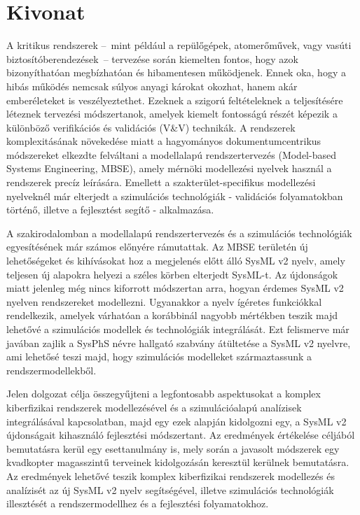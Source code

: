\setcounter{page}{1}

\selecthungarian

\chapter*{Kivonat}

A kritikus rendszerek --~mint például a repülőgépek, atomerőművek, vagy vasúti biztosítóberendezések~-- tervezése során kiemelten fontos, hogy azok bizonyíthatóan megbízhatóan és hibamentesen működjenek. Ennek oka, hogy a hibás működés nemcsak súlyos anyagi károkat okozhat, hanem akár emberéleteket is veszélyeztethet. Ezeknek a szigorú feltételeknek a teljesítésére léteznek tervezési módszertanok, amelyek kiemelt fontosságú részét képezik a különböző verifikációs és validációs (V\&V) technikák. A rendszerek komplexitásának növekedése miatt a hagyományos dokumentumcentrikus módszereket elkezdte felváltani a modellalapú rendszertervezés (Model-based Systems Engineering, MBSE), amely mérnöki modellezési nyelvek használ a rendszerek precíz leírására. Emellett a szakterület-specifikus modellezési nyelveknél már elterjedt a szimulációs technológiák - validációs folyamatokban történő, illetve a fejlesztést segítő - alkalmazása.

A szakirodalomban a modellalapú rendszertervezés és a szimulációs technológiák egyesítésének már számos előnyére rámutattak. Az MBSE területén új lehetőségeket és kihívásokat hoz a megjelenés előtt álló SysML v2 nyelv, amely teljesen új alapokra helyezi a széles körben elterjedt SysML-t. Az újdonságok miatt jelenleg még nincs kiforrott módszertan arra, hogyan érdemes SysML v2 nyelven rendszereket modellezni. Ugyanakkor a nyelv ígéretes funkciókkal rendelkezik, amelyek várhatóan a korábbinál nagyobb mértékben teszik majd lehetővé a szimulációs modellek és technológiák integrálását. Ezt felismerve már javában zajlik a SysPhS névre hallgató szabvány átültetése a SysML v2 nyelvre, ami lehetősé teszi majd, hogy szimulációs modelleket származtassunk a rendszermodellekből.

Jelen dolgozat célja összegyűjteni a legfontosabb aspektusokat a komplex kiberfizikai rendszerek modellezésével és a szimulációalapú analízisek integrálásával kapcsolatban, majd egy ezek alapján kidolgozni egy, a SysML v2 újdonságait kihasználó fejlesztési módszertant. Az eredmények  értékelése céljából bemutatásra kerül egy esettanulmány is, mely során a javasolt módszerek egy kvadkopter magasszintű terveinek kidolgozásán keresztül kerülnek bemutatásra. Az eredmények lehetővé teszik komplex kiberfizikai rendszerek modellezés és analízisét az új SysML v2 nyelv segítségével, illetve szimulációs technológiák illesztését a rendszermodellhez és a fejlesztési folyamatokhoz.

